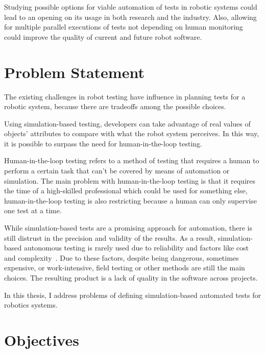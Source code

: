 Studying possible options for viable automation of tests in robotic systems could lead to an opening on its usage in both research and the industry. Also, allowing for multiple parallel executions of tests not depending on human monitoring could improve the quality of current and future robot software.


\section{Problem Statement}
\label{sec:problem}

The existing challenges in robot testing have influence in planning tests for a robotic system, because there are tradeoffs among the possible choices.

Using simulation-based testing, developers can take advantage of real values of objects' attributes to compare with what the robot system perceives. In this way, it is possible to surpass the need for human-in-the-loop testing.

Human-in-the-loop testing refers to a method of testing that requires a human to perform a certain task that can't be covered by means of automation or simulation. The main problem with human-in-the-loop testing is that it requires the time of a high-skilled professional which could be used for something else, human-in-the-loop testing is also restricting because a human can only supervise one test at a time.
 
While simulation-based tests are a promising approach for automation, there is still distrust in the precision and validity of the results. As a result, simulation-based autonomous testing is rarely used due to reliability and factors like cost and complexity~\cite{9240632,zizyte2021importance}.
Due to these factors, despite being dangerous, sometimes expensive, or work-intensive, field testing or other methods are still the main choices. The resulting product is a lack of quality in the software across projects.

In this thesis, I address problems of defining simulation-based automated tests for robotics systems.


\section{Objectives}
\label{sec:objectives}

